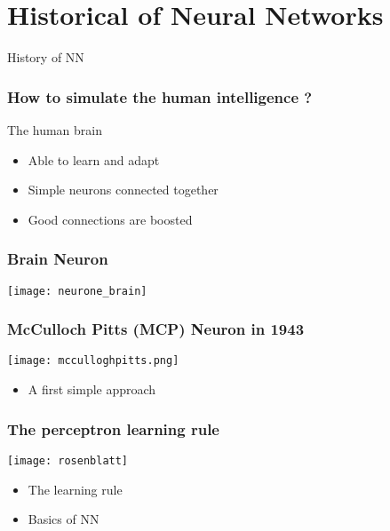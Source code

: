 \documentclass[11pt]{beamer}
\begin{document}
\section{Historical of Neural Networks}
\label{sec:histoire}

\begin{frame}[plain]
  \begin{center}
    {\Huge History of NN}
  \end{center}
  
\end{frame}

\begin{frame}
  \frametitle{How to simulate the human intelligence ?}
  \begin{block}{The human brain}
    \begin{itemize}
    \item Able to learn and adapt
    \item Simple neurons connected together
    \item Good connections are boosted
    \end{itemize}
  \end{block}
\end{frame}

\begin{frame}
  \frametitle{Brain Neuron}
  \texttt{[image: neurone\_brain]}
\end{frame}

\begin{frame}
  \frametitle{McCulloch Pitts (MCP) Neuron in 1943}
  \texttt{[image: mcculloghpitts.png]}
  \begin{itemize}
  \item A first simple approach
  \end{itemize}
\end{frame}

\begin{frame}
  \frametitle{The perceptron learning rule}
  \texttt{[image: rosenblatt]}
  \begin{itemize}
  \item The learning rule
  \item Basics of NN
  \end{itemize}
\end{frame}
\end{document}
